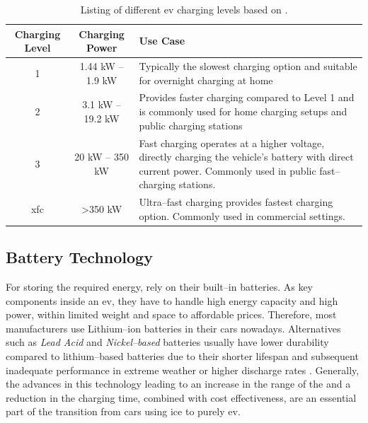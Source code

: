 \begingroup
\setlength{\tabcolsep}{10pt} %
\renewcommand{\arraystretch}{1.5} %
\begin{table}[h]
    \centering
    \caption{Listing of different \acrshort{ev} charging levels based on \cite{acharige_review_2023}.}
    \begin{tabular}{c|c|m{6.5cm}}
        Charging Level & Charging Power & Use Case \\ \hline
         1 & 1.44 kW -- 1.9 kW & Typically the slowest charging option and suitable for overnight charging at home \\
         2 & 3.1 kW -- 19.2 kW & Provides faster charging compared to Level 1 and is commonly used for home charging setups and public charging stations \\
         3 & 20 kW -- 350 kW & Fast charging operates at a higher voltage, directly charging the vehicle's battery with direct current power. Commonly used in public fast--charging stations.\\
         \acrshort{xfc} & >350 kW & Ultra--fast charging provides fastest charging option. Commonly used in commercial settings.
    \end{tabular}
    \label{tab:ev-charging-levels}
\end{table}
\endgroup

\newpage

\subsection{Battery Technology}
\label{ch:Fundamentals:sec:Electric Mobility:ssec:Battery Technology}

For storing the required energy,  rely on their built--in batteries. As key components inside an \acrshort{ev}, they have to handle high energy capacity and high power, within limited weight and space to affordable prices.
Therefore, most manufacturers use Lithium--ion batteries in their cars nowadays.
Alternatives such as \textit{Lead Acid} and \textit{Nickel--based} batteries usually have lower durability compared to lithium--based batteries due to their shorter lifespan and subsequent inadequate performance in extreme weather or higher discharge rates \cite{acharige_review_2023}.
Generally, the advances in this technology leading to an increase in the range of the  and a reduction in the charging time, combined with cost effectiveness, are an essential part of the transition from cars using \acrshort{ice} to purely \acrshort{ev}.


